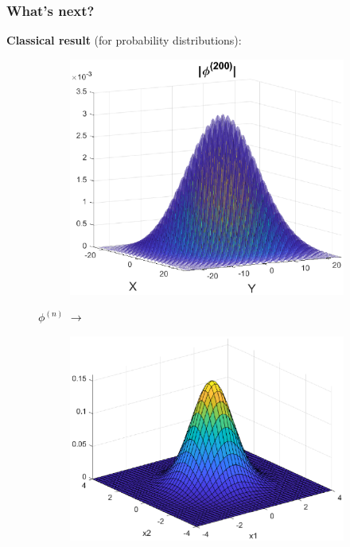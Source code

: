 \documentclass{beamer}
\theoremstyle{definition}
\begin{document}
\begin{frame}
\frametitle{What's next?}


\textbf{Classical result} (for probability distributions):

\begin{figure}
	\vspace{-10pt}
	\begin{subfigure}{0.27\textwidth}
		\centering
		\includegraphics[width=\textwidth]{convolve_22.eps}
	\end{subfigure}
\textcolor{black}{$\phi^{(n)}$ $\to$}
	\begin{subfigure}{0.27\textwidth}
		\centering
		\includegraphics[width=\textwidth]{gauss2d.eps}
	\end{subfigure}
\end{figure}



\end{frame}
\end{document}

